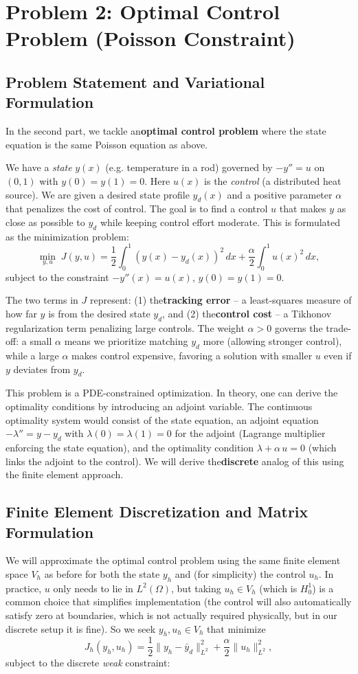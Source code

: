 \section{Problem 2: Optimal Control Problem (Poisson Constraint)}

\subsection{Problem Statement and Variational Formulation}
In the second part, we tackle an\textbf{optimal control problem} where the state equation is the same Poisson equation as above.

We have a \emph{state} \(y(x)\) (e.g. temperature in a rod) governed by \(-y'' = u\) on \((0,1)\) with \(y(0)=y(1)=0\).
Here \(u(x)\) is the \emph{control} (a distributed heat source).
We are given a desired state profile \(y_d(x)\) and a positive parameter \(\alpha\) that penalizes the cost of control.
The goal is to find a control \(u\) that makes \(y\) as close as possible to \(y_d\) while keeping control effort moderate.
This is formulated as the minimization problem:
\[\min_{y,u} \; J(y,u) = \frac{1}{2}\int_0^1 (y(x) - y_d(x))^2\,dx + \frac{\alpha}{2}\int_0^1 u(x)^2\,dx,\]
subject to the constraint \(-y''(x) = u(x)\), \(y(0)=y(1)=0\).

The two terms in \(J\) represent: (1) the\textbf{tracking error} – a least-squares measure of how far \(y\) is from the desired state \(y_d\), and (2) the\textbf{control cost} – a Tikhonov regularization term penalizing large controls. The weight \(\alpha > 0\) governs the trade-off: a small \(\alpha\) means we prioritize matching \(y_d\) more (allowing stronger control), while a large \(\alpha\) makes control expensive, favoring a solution with smaller \(u\) even if \(y\) deviates from \(y_d\).

This problem is a PDE-constrained optimization. In theory, one can derive the optimality conditions by introducing an adjoint variable. The continuous optimality system would consist of the state equation, an adjoint equation \(-\lambda'' = y - y_d\) with \(\lambda(0)=\lambda(1)=0\) for the adjoint (Lagrange multiplier enforcing the state equation), and the optimality condition \(\lambda + \alpha\,u = 0\) (which links the adjoint to the control). We will derive the\textbf{discrete} analog of this using the finite element approach.

\subsection{Finite Element Discretization and Matrix Formulation}
We will approximate the optimal control problem using the same finite element space \(V_h\) as before for both the state \(y_h\) and (for simplicity) the control \(u_h\). In practice, \(u\) only needs to lie in \(L^2(\Omega)\), but taking \(u_h \in V_h\) (which is \(H^1_0\)) is a common choice that simplifies implementation (the control will also automatically satisfy zero at boundaries, which is not actually required physically, but in our discrete setup it is fine). So we seek \(y_h, u_h \in V_h\) that minimize
\[J_h(y_h, u_h) = \frac{1}{2}\|y_h - \bar{y}_d\|^2_{L^2} + \frac{\alpha}{2}\|u_h\|^2_{L^2},\]
subject to the discrete \emph{weak} constraint:

